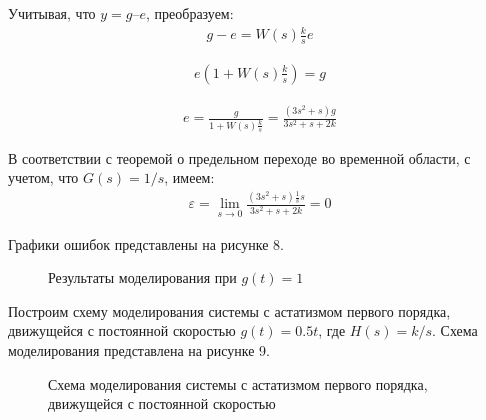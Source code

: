 \documentclass[a4paper, 11pt]{article}
\begin{document}
\par 
Учитывая, что $y = g – e$, преобразуем:
\begin{align}
\displaystyle g-e=W(s)\frac{k}{s}e
\end{align} 

\begin{align}
\displaystyle e(1+W(s)\frac{k}{s})=g
\end{align} 

\begin{align}
e=\displaystyle\frac{g}{1+W(s)\frac{k}{s}}=\frac{(3s^2+s)g}{3s^2+s+2k}
\end{align} 

\par 
В соответствии с теоремой о предельном переходе во временной области, с учетом, что $G(s) = 1/s$, имеем: 
\begin{align}
\varepsilon=\lim_{s\to 0}\displaystyle\frac{(3s^2+s)\frac{1}{s}s}{3s^2+s+2k}=0
\end{align}

\par 
Графики ошибок представлены на рисунке 8.

\begin{figure}[h!]
\centering
{}
\caption{Результаты моделирования при $g(t)=1$}
\end{figure}

\newpage
\par 
Построим схему моделирования системы с астатизмом первого порядка, движущейся с постоянной скоростью $g(t) = 0.5t$, где $H(s)=k/s$. Схема моделирования представлена на рисунке 9.

\begin{figure}[h!]
\caption{Схема моделирования системы с астатизмом первого порядка, движущейся с постоянной скоростью}
\label{ris:image}
\end{figure}
\end{document}
